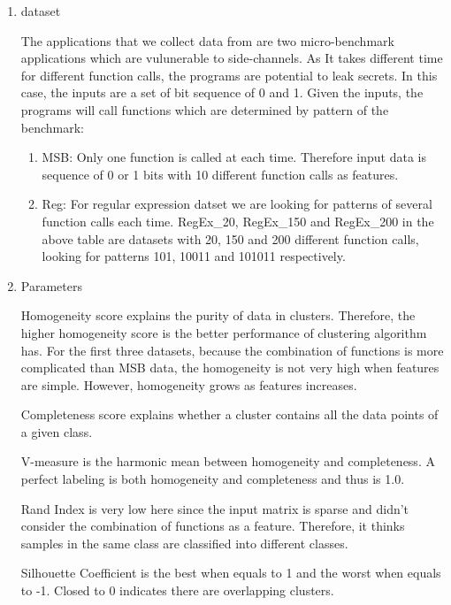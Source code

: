 \documentclass{article}
\begin{document}
\begin{enumerate}

    \item dataset

    The applications that we collect data from are two micro-benchmark applications which are vulunerable to side-channels. As It takes different time for different function calls, the programs are potential to leak secrets. In this case, the inputs are a set of bit sequence of 0 and 1. Given the inputs, the programs will call functions which are determined by pattern of the benchmark:

    \begin{enumerate}
        \item
        MSB: Only one function is called at each time. Therefore input data is sequence of 0 or 1 bits with 10 different function calls as features.

        \item
        Reg: For regular expression datset we are looking for patterns of several function calls each time. RegEx\_20, RegEx\_150 and RegEx\_200 in the above table are datasets with 20, 150 and 200 different function calls, looking for patterns 101, 10011 and 101011 respectively.

    \end{enumerate}
    \item Parameters

    Homogeneity score explains the purity of data in clusters. Therefore, the higher homogeneity score is the better performance of clustering algorithm has. For the first three datasets, because the combination of functions is more complicated than MSB data, the homogeneity is not very high when features are simple. However, homogeneity grows as features increases.

    Completeness score explains whether a cluster contains all the data points of a given class.

    V-measure is the harmonic mean between homogeneity and completeness. A perfect labeling is both homogeneity and completeness and thus is 1.0.

    Rand Index is very low here since the input matrix is sparse and didn’t consider the combination of functions as a feature. Therefore, it thinks samples in the same class are classified into different classes.

    Silhouette Coefficient is the best when equals to 1 and the worst when equals to -1. Closed to 0 indicates there are overlapping clusters.

\end{enumerate}
\end{document}
